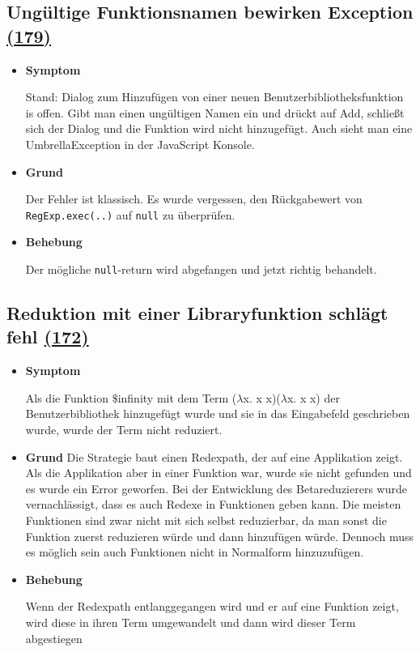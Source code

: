 \documentclass[parskip=full,11pt,twoside]{scrartcl}
\newcommand{\issueref}[1]{
    \href{https://git.scc.kit.edu/ap/Aurora/issues/#1}{(#1)}
}
\newcommand{\regrtest}[5]{
    \subsection{#1 \issueref{#2}}
    \begin{itemize}
        \item \textbf{Symptom}
            #3
        \item \textbf{Grund}
            #4
        \item \textbf{Behebung}
            #5
    \end{itemize}
}
\begin{document}
    \regrtest{Ungültige Funktionsnamen bewirken Exception}{179}{
        Stand: Dialog zum Hinzufügen von einer neuen Benutzerbibliotheksfunktion is offen.
        Gibt man einen ungültigen Namen ein und drückt auf Add, schließt sich der Dialog und die Funktion wird nicht
        hinzugefügt. Auch sieht man eine UmbrellaException in der JavaScript Konsole.
    }{
        Der Fehler ist klassisch. Es wurde vergessen, den Rückgabewert von \texttt{RegExp.exec(..)} auf \texttt{null} zu überprüfen.
    }{
        Der mögliche \texttt{null}-return wird abgefangen und jetzt richtig behandelt.
  }
\regrtest{Reduktion mit einer Libraryfunktion schlägt fehl}{172}{
	Als die Funktion $\$$infinity mit dem Term ($\lambda$x. x x)($\lambda$x. x x) der
	Benutzerbibliothek hinzugefügt wurde und sie in
	das Eingabefeld geschrieben wurde, wurde der Term nicht reduziert.
}{ Die Strategie baut einen Redexpath, der auf eine Applikation zeigt. Als die Applikation aber in einer
	Funktion war, wurde sie nicht gefunden und es wurde ein Error geworfen. Bei der Entwicklung des Betareduzierers
	wurde vernachlässigt, dass es auch Redexe in Funktionen geben kann. Die meisten Funktionen sind zwar nicht
	mit sich selbst	reduzierbar, da man sonst die Funktion zuerst reduzieren würde und dann hinzufügen würde.
	Dennoch muss es möglich sein auch Funktionen nicht in Normalform hinzuzufügen.
}{
	Wenn der Redexpath entlanggegangen wird und er auf eine Funktion zeigt, wird diese in ihren Term umgewandelt und
	dann wird dieser Term abgestiegen
}
\end{document}
